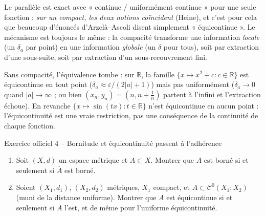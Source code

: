 \documentclass[11pt,a4paper]{article}
\newcommand{\R}{\mathbb{R}}
\newcommand{\adh}[1]{\overline{#1}}
\newcommand{\Cz}{\mathcal{C}^0}
\theoremstyle{definition}
\begin{document}
\begin{pointcle}
Le parallèle est exact avec « continue / uniformément continue » pour une seule fonction : \emph{sur un compact, les deux notions coïncident} (Heine), et c'est pour cela que beaucoup d'énoncés d'Arzelà--Ascoli disent simplement « équicontinue ». Le mécanisme est toujours le même : la compacité transforme une information \emph{locale} (un $\delta_a$ par point) en une information \emph{globale} (un $\delta$ pour tous), soit par extraction d'une sous-suite, soit par extraction d'un sous-recouvrement fini.
\end{pointcle}

\begin{piege}
Sans compacité, l'équivalence tombe : sur $\R$, la famille $\{x\mapsto x^2+c : c\in\R\}$ est équicontinue en tout point ($\delta_a\approx\varepsilon/(2|a|+1)$) mais pas uniformément ($\delta_a\to0$ quand $|a|\to\infty$ ; ou bien $(x_n,y_n)=(n,n+\frac1n)$ partent à l'infini et l'extraction échoue). En revanche $\{x\mapsto\sin(tx) : t\in\R\}$ n'est équicontinue en aucun point : l'équicontinuité est une vraie restriction, pas une conséquence de la continuité de chaque fonction.
\end{piege}

\begin{exo}{Exercice officiel 4 -- Bornitude et équicontinuité passent à l'adhérence}
\begin{enumerate}[label=\alph*)]
  \item Soit $(X,d)$ un espace métrique et $A\subset X$. Montrer que $A$ est borné si et seulement si $\adh A$ est borné.
  \item Soient $(X_1,d_1)$, $(X_2,d_2)$ métriques, $X_1$ compact, et $A\subset\Cz(X_1;X_2)$ (muni de la distance uniforme). Montrer que $A$ est équicontinue si et seulement si $\adh A$ l'est, et de même pour l'uniforme équicontinuité.
\end{enumerate}
\end{exo}
\end{document}
